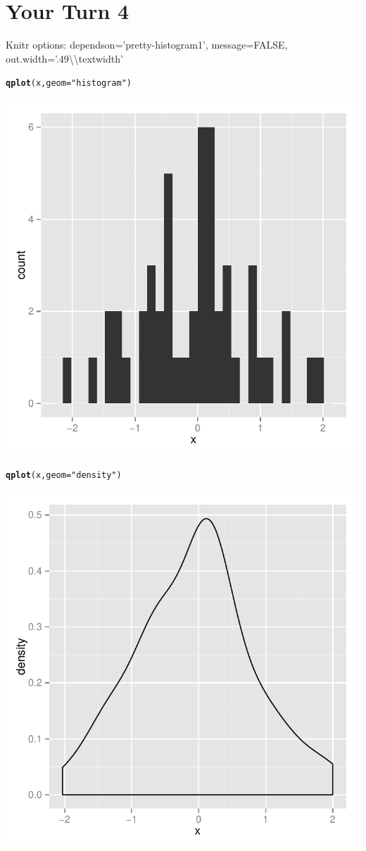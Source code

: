 \documentclass{article}\usepackage[]{graphicx}\usepackage[]{color}
\makeatletter
\newcommand{\hlstr}[1]{\textcolor[rgb]{0.192,0.494,0.8}{#1}}%
\newcommand{\hlstd}[1]{\textcolor[rgb]{0.345,0.345,0.345}{#1}}%
\newcommand{\hlkwc}[1]{\textcolor[rgb]{0.333,0.667,0.333}{#1}}%
\newcommand{\hlkwd}[1]{\textcolor[rgb]{0.737,0.353,0.396}{\textbf{#1}}}%
\newenvironment{kframe}{%
 \def\at@end@of@kframe{}%
 \ifinner\ifhmode%
  \def\at@end@of@kframe{\end{minipage}}%
  \begin{minipage}{\columnwidth}%
 \fi\fi%
 \def\FrameCommand##1{\hskip\@totalleftmargin \hskip-\fboxsep
 \colorbox{shadecolor}{##1}\hskip-\fboxsep
     \hskip-\linewidth \hskip-\@totalleftmargin \hskip\columnwidth}%
 \MakeFramed {\advance\hsize-\width
   \@totalleftmargin\z@ \linewidth\hsize
   \@setminipage}}%
 {\par\unskip\endMakeFramed%
 \at@end@of@kframe}
\newenvironment{knitrout}{}{} %
\makeatother
\begin{document}
\section{Your Turn 4}
\noindent Knitr options: dependson='pretty-histogram1', message=FALSE, out.width='.49\textbackslash\textbackslash textwidth'
\begin{knitrout}
\color{fgcolor}\begin{kframe}
\begin{alltt}
\hlkwd{qplot}\hlstd{(x,} \hlkwc{geom} \hlstd{=} \hlstr{"histogram"}\hlstd{)}
\end{alltt}
\end{kframe}

{\centering \includegraphics[width=.49\textwidth]{figure/lots-of-plots1} 

}


\begin{kframe}\begin{alltt}
\hlkwd{qplot}\hlstd{(x,} \hlkwc{geom} \hlstd{=} \hlstr{"density"}\hlstd{)}
\end{alltt}
\end{kframe}

{\centering \includegraphics[width=.49\textwidth]{figure/lots-of-plots2} 

}



\end{knitrout}
\end{document}
